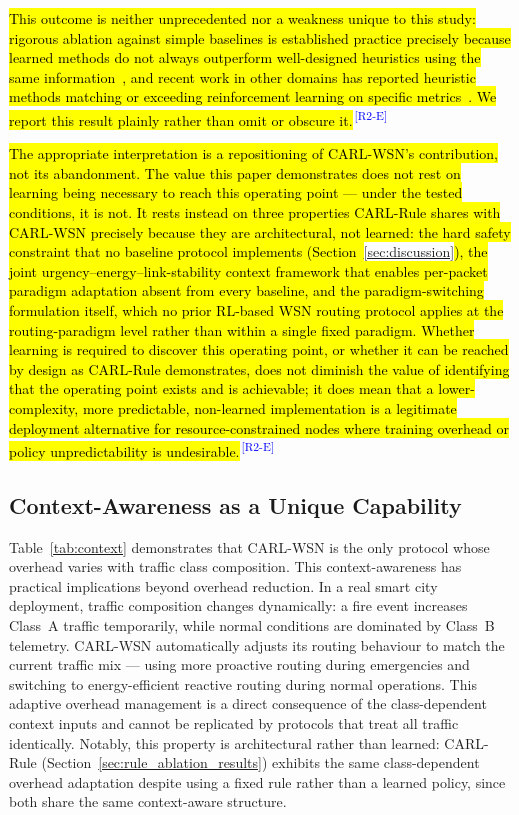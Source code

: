 \documentclass[12pt]{article}
\newcommand{\rtag}[1]{\textsuperscript{\textcolor{blue}{\scriptsize\,[#1]}}}
\newcommand{\hlx}[1]{{\exhyphenpenalty=10000\hyphenpenalty=10000\let\ \nobreakspace\hl{#1}}}
\begin{document}
\hlx{This outcome is neither unprecedented nor a weakness unique to this
study: rigorous ablation against simple baselines is established
practice precisely because learned methods do not always
outperform well-designed heuristics using the same
information~}\cite{henderson2018}\hlx{, and recent work in other domains
has reported heuristic methods matching or exceeding reinforcement
learning on specific
metrics~}\cite{bairaktaris2025}\hlx{. We report this result plainly rather
than omit or obscure it.}\rtag{R2-E}

\hlx{The appropriate interpretation is a repositioning of CARL-WSN's
contribution, not its abandonment. The value this paper demonstrates
does not rest on learning being necessary to reach this operating
point --- under the tested conditions, it is not. It rests instead on
three properties CARL-Rule shares with CARL-WSN precisely because
they are architectural, not learned: the hard safety constraint
that no baseline protocol implements (Section~}\ref{sec:discussion}\hlx{),
the joint urgency--energy--link-stability context framework that
enables per-packet paradigm adaptation absent from every baseline,
and the paradigm-switching formulation itself, which no prior
RL-based WSN routing protocol applies at the routing-paradigm level
rather than within a single fixed paradigm. Whether learning is
required to discover this operating point, or whether it can be
reached by design as CARL-Rule demonstrates, does not diminish the
value of identifying that the operating point exists and is
achievable; it does mean that a lower-complexity, more
predictable, non-learned implementation is a legitimate deployment
alternative for resource-constrained nodes where training overhead
or policy unpredictability is undesirable.}\rtag{R2-E}

\subsection{Context-Awareness as a Unique Capability}

Table~\ref{tab:context} demonstrates that CARL-WSN is the only
protocol whose overhead varies with traffic class composition.
This context-awareness has practical implications beyond overhead
reduction. In a real smart city deployment, traffic composition
changes dynamically: a fire event increases Class~A traffic
temporarily, while normal conditions are dominated by Class~B
telemetry. CARL-WSN automatically adjusts its routing behaviour
to match the current traffic mix --- using more proactive routing
during emergencies and switching to energy-efficient reactive
routing during normal operations. This adaptive overhead management
is a direct consequence of the class-dependent context inputs and
cannot be replicated by protocols that treat all traffic
identically. Notably, this property is architectural rather than
learned: CARL-Rule (Section~\ref{sec:rule_ablation_results}) exhibits
the same class-dependent overhead adaptation despite using a fixed
rule rather than a learned policy, since both share the same
context-aware structure.
\end{document}
